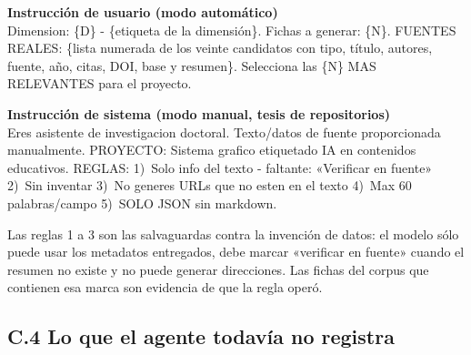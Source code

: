 \documentclass[letter,12pt]{article}
\begin{document}
\begin{mdframed}[style=cajaCotejo]
\textbf{\textcolor{colorCotejo}{Instrucción de usuario (modo automático)}}\\[4pt]
\footnotesize
Dimension: \{D\} - \{etiqueta de la dimensión\}. Fichas a generar: \{N\}. FUENTES REALES: \{lista numerada de los veinte candidatos con tipo, título, autores, fuente, año, citas, DOI, base y resumen\}. Selecciona las \{N\} MAS RELEVANTES para el proyecto.
\end{mdframed}

\begin{mdframed}[style=cajaCotejo]
\textbf{\textcolor{colorCotejo}{Instrucción de sistema (modo manual, tesis de repositorios)}}\\[4pt]
\footnotesize
Eres asistente de investigacion doctoral. Texto/datos de fuente proporcionada manualmente. PROYECTO: Sistema grafico etiquetado IA en contenidos educativos. REGLAS: 1)~Solo info del texto - faltante: «Verificar en fuente» 2)~Sin inventar 3)~No generes URLs que no esten en el texto 4)~Max 60 palabras/campo 5)~SOLO JSON sin markdown.
\end{mdframed}

Las reglas 1 a 3 son las salvaguardas contra la invención de datos: el modelo sólo puede usar los metadatos entregados, debe marcar «verificar en fuente» cuando el resumen no existe y no puede generar direcciones. Las fichas del corpus que contienen esa marca son evidencia de que la regla operó.

\subsection*{C.4 Lo que el agente todavía no registra}
\end{document}
